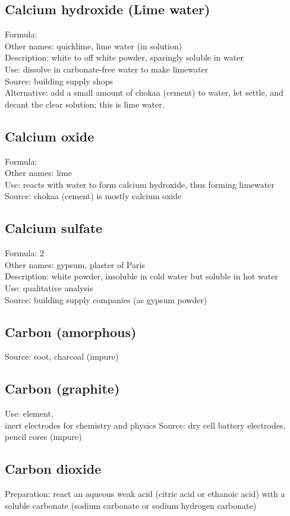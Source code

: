 \subsection*{Calcium hydroxide (Lime water)}
Formula: \\
Other names: quicklime, lime water (in solution)\\
Description: white to off white powder, 
sparingly soluble in water\\
Use: dissolve in carbonate-free water to make limewater\\
Source: building supply shops\\
Alternative: add a small amount of chokaa (cement) to water, 
let settle, 
and decant the clear solution; 
this is lime water.
\subsection*{Calcium oxide}
Formula: \\
Other names: lime\\
Use: reacts with water to form calcium hydroxide, 
thus forming limewater\\
Source: chokaa (cement) is mostly calcium oxide
\subsection*{Calcium sulfate}
Formula:  2\\
Other names: gypsum, 
plaster of Paris\\
Description: white powder, 
insoluble in cold water but soluble in hot water\\
Use: qualitative analysis\\
Source: building supply companies (as gypsum powder)
\subsection*{Carbon (amorphous)}
Source: soot, 
charcoal (impure)
\subsection*{Carbon (graphite)}
\label{sec:carbongraphite}
Use: element, \\
inert electrodes for chemistry and physics
Source: dry cell battery electrodes, 
pencil cores (impure)
\subsection*{Carbon dioxide}
Preparation: react an aqueous weak acid 
(citric acid or ethanoic acid) with a soluble carbonate 
(sodium carbonate or sodium hydrogen carbonate)
